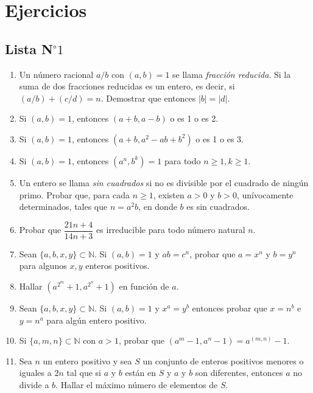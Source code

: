 \section{Ejercicios}
\subsection{Lista N$^{\circ}1$}
\begin{enumerate}[font={\bfseries},label={\arabic*.}]
\item Un número racional $a/b$ con $(a,b)=1$ se llama \emph{fracción reducida}. Si la suma de dos fracciones reducidas es un entero, es decir, si $(a/b)+(c/d)=n$. Demostrar que entonces $|b|=|d|$.

\item Si $(a,b)=1$, entonces $(a+b,a-b)$ o es 1 o es 2.

\item Si $(a,b)=1$, entonces $(a+b,a^{2}-ab+b^{2})$ o es 1 o es 3.

\item Si $(a,b)=1$, entonces $(a^{n},b^{k})=1$ para todo $n\geq1, k\geq1$.

\item Un entero se llama \emph{sin cuadrados} si no es divisible por el cuadrado de ningún primo. Probar que, para cada $n\geq1$, existen $a>0$ y $b>0$, unívocamente determinados, tales que $n=a^{2}b$, en donde $b$ es sin cuadrados.

\item Probar que $\dfrac{21n+4}{14n+3}$ es irreducible para todo número natural $n$.

\item Sean $\{a,b,x,y\}\subset\mathbb{N}$. Si $(a,b)=1$ y $ab=c^{n}$, probar que $a=x^{n}$ y $b=y^{n}$ para algunos $x,y$ enteros positivos.

\item Hallar $\left(a^{2^{m}}+1,a^{2^{n}}+1\right)$ en función de $a$.

\item Sean $\{a,b,x,y\}\subset\mathbb{N}$. Si $(a,b)=1$ y $x^{a}=y^{b}$ entonces probar que $x=n^{b}$ e $y=n^{a}$ para algún entero positivo.

\item Si $\{a,m,n\}\subset\mathbb{N}$ con $a>1$, probar que $\left(a^{m}-1,a^{n}-1\right)=a^{(m,n)}-1$.

\item Sea $n$ un entero positivo y sea $S$ un conjunto de enteros positivos menores o iguales a $2n$ tal que si $a$ y $b$ están en $S$ y $a$ y $b$ son diferentes, entonces $a$ no divide a $b$. Hallar el máximo número de elementos de $S$.


\end{enumerate}
